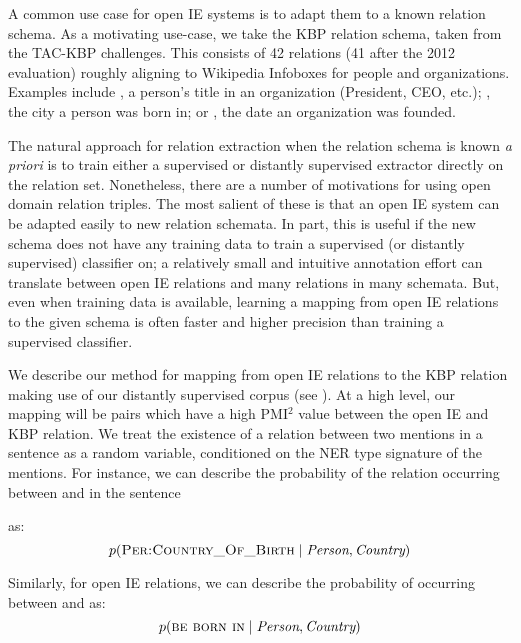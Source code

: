 A common use case for open IE systems is to adapt them to a
  known relation schema.
As a motivating use-case, we take the KBP relation schema, taken from
  the TAC-KBP challenges.
This consists of 42 relations (41 after the 2012 evaluation) roughly
  aligning to Wikipedia Infoboxes for people and organizations.
  Examples include , a person's title in an
  organization (President, CEO, etc.); , the
  city a person was born in; or , the date an organization
  was founded.

The natural approach for relation extraction when the relation
  schema is known \textit{a priori} is to train either 
  a supervised or distantly supervised extractor
  directly on the relation set.
Nonetheless, there are a number of motivations for using open domain
  relation triples.
The most salient of these is that an open IE system can be adapted
  easily to new relation schemata.
In part, this is useful if the new schema does not have any training data
  to train a supervised (or distantly supervised) classifier on; a relatively
  small and intuitive annotation effort can translate between open IE relations
  and many relations in many schemata.
But, even when training data is available, learning a mapping from open IE
  relations to the given schema is often faster and higher precision than
  training a supervised classifier.

We describe our method for mapping from open IE relations to the KBP relation
  making use of our distantly supervised corpus (see ).
At a high level, our mapping will be pairs which have a high PMI$^2$ value
  between the open IE and KBP relation.
We treat the existence of a relation between two mentions in a sentence as
  a random variable, conditioned on the NER type signature of the mentions.
For instance, we can describe the probability of the relation 
   occurring between  and
   in the sentence
\begin{center}
\end{center}
as:
\begin{equation*}
  p(\textsc{Per:Country\_Of\_Birth} \mid \textit{Person}, \textit{Country})
\end{equation*}

Similarly, for open IE relations, we can describe the probability of
   occurring between  and  as:
\begin{equation*}
  p(\textsc{be born in} \mid \textit{Person}, \textit{Country})
\end{equation*}

